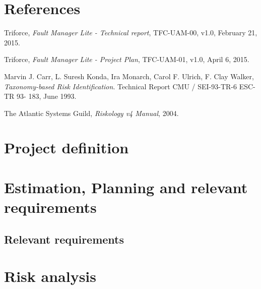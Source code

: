 \documentclass[11pt]{report}
\begin{document}
\chapter{References}
\label{chapReferences}
\let\oldchapter\chapter
\renewcommand{\chapter}[2]{}
\begin{thebibliography}{9}
	Triforce,
	\emph{Fault Manager Lite - Technical report},
	TFC-UAM-00,
	v1.0,
	February 21, 2015.

	Triforce,
	\emph{Fault Manager Lite - Project Plan},
	TFC-UAM-01,
	v1.0,
	April 6, 2015.

	Marvin J. Carr, L. Suresh Konda, Ira Monarch, Carol F. Ulrich, F. Clay Walker,
	\emph{Taxonomy-based Risk Identification}.
	Technical Report CMU / SEI-93-TR-6 ESC-TR 93- 183,
	June 1993.

	The Atlantic Systems Guild,
	\emph{Riskology v4 Manual},
	2004.

\end{thebibliography}
\let\chapter\oldchapter

\chapter{Project definition}
\label{chapDef}



\chapter{Estimation, Planning and relevant requirements}
\label{chapPlan}


\section{Relevant requirements}


\chapter{Risk analysis}
\label{chapRiskAnalysis}
\end{document}
